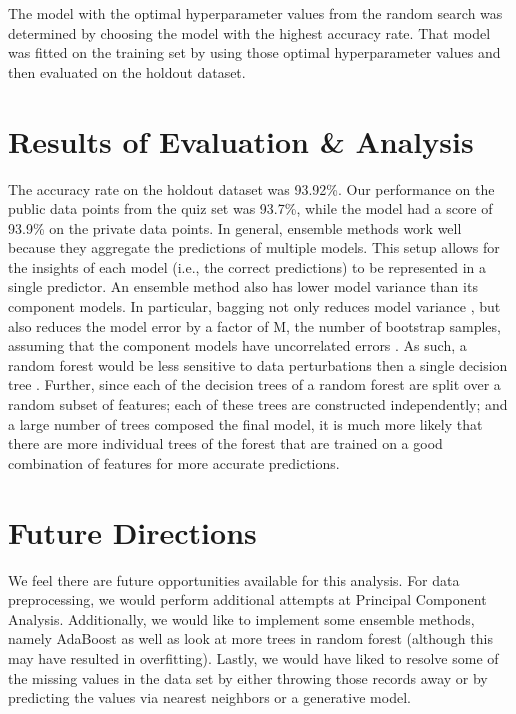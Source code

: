 \documentclass[twoside,11pt]{article}
\begin{document}
The model with the optimal hyperparameter values from the random search was determined by choosing the model with the highest accuracy rate.  That model was fitted on the training set by using those optimal hyperparameter values and then evaluated on the holdout dataset.

\section{Results of Evaluation \& Analysis}
The accuracy rate on the holdout dataset was  93.92\%. Our performance on the public data points from the quiz set was 93.7\%, while the model had a score of 93.9\% on the private data points. In general, ensemble methods work well because they aggregate the predictions of multiple models. This setup allows for the insights of each model (i.e., the correct predictions) to be represented in a single predictor. An ensemble method also has lower model variance than its component models. In particular, bagging not only reduces model variance \citep[chap.~11]{hal06}, but also reduces the model error by a factor of M, the number of bootstrap samples, assuming that the component models have uncorrelated errors \citep[chap.~14]{chris06}. As such, a random forest would be less sensitive to data perturbations then a single decision tree \citep[chap.~11]{hal06}. Further, since each of the decision trees of a random forest are split over a random subset of features; each of these trees are constructed independently; and a large number of trees composed the final model, it is much more likely that there are more individual trees of the forest that are trained on a good combination of features for more accurate predictions.

\section{Future Directions}
We feel there are future opportunities available for this analysis. For data preprocessing, we would perform additional attempts at Principal Component Analysis.  Additionally, we would like to implement some ensemble methods, namely AdaBoost as well as look at more trees in random forest (although this may have resulted in overfitting).  Lastly, we would have liked to resolve some of the missing values in the data set by either throwing those records away or by predicting the values via nearest neighbors or a generative model.

\end{document}
